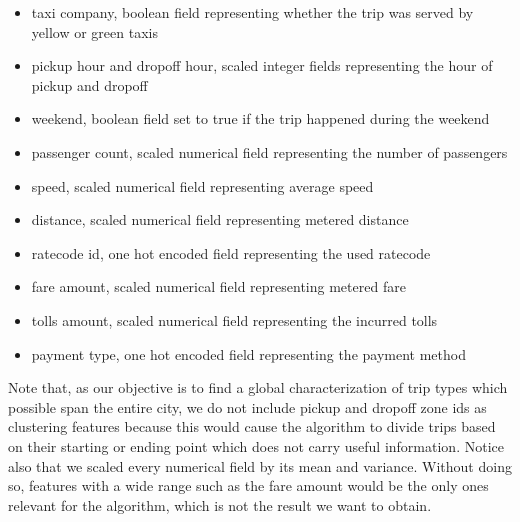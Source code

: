 \documentclass{acm_proc_article-sp-sigmod09}
\begin{document}
\begin{itemize}
	\item taxi company, boolean field representing whether the trip was served by yellow or green taxis
	\item pickup hour and dropoff hour, scaled integer fields representing the hour of pickup and dropoff
	\item weekend, boolean field set to true if the trip happened during the weekend
	\item passenger count, scaled numerical field representing the number of passengers
	\item speed, scaled numerical field representing average speed
	\item distance, scaled numerical field representing metered distance
	\item ratecode id, one hot encoded field representing the used ratecode
	\item fare amount, scaled numerical field representing metered fare
	\item tolls amount, scaled numerical field representing the incurred tolls
	\item payment type, one hot encoded field representing the payment method
\end{itemize}  

Note that, as our objective is to find a global characterization of trip types which possible span the entire city, we do not include pickup and dropoff zone ids as clustering features because this would cause the algorithm to divide trips based on their starting or ending point which does not carry useful information. Notice also that we scaled every numerical field by its mean and variance. Without doing so, features with a wide range such as the fare amount would be the only ones relevant for the algorithm, which is not the result we want to obtain.
\end{document}
